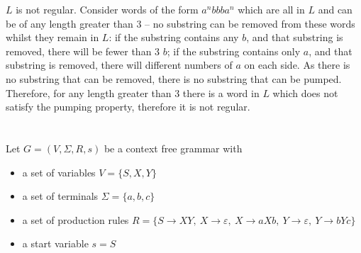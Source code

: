 \documentclass[10pt]{article} %
\begin{document}
\vspace{10px}

$L$ is not regular. Consider words of the form $a^nbbba^n$ which are all in $L$ and can be of any length greater than 3 -- no substring can be removed from these words whilst they remain in $L$: if the substring contains any $b$, and that substring is removed, there will be fewer than 3 $b$; if the substring contains only $a$, and that substring is removed, there will different numbers of $a$ on each side. As there is no substring that can be removed, there is no substring that can be pumped. Therefore, for any length greater than 3 there is a word in $L$ which does not satisfy the pumping property, therefore it is not regular.

\section{}
Let $G=(V,\Sigma,R,s)$ be a context free grammar with
\begin{itemize}
	\item a set of variables $V=\{S,X,Y\}$
	\item a set of terminals $\Sigma = \{a,b,c\}$
	\item a set of production rules $R = \{S \to XY, \ X \to \varepsilon, \ X \to aXb, \ Y \to \varepsilon, \ Y \to bYc\}$
	\item a start variable $s=S$
\end{itemize}

\vspace{20px}
\end{document}
